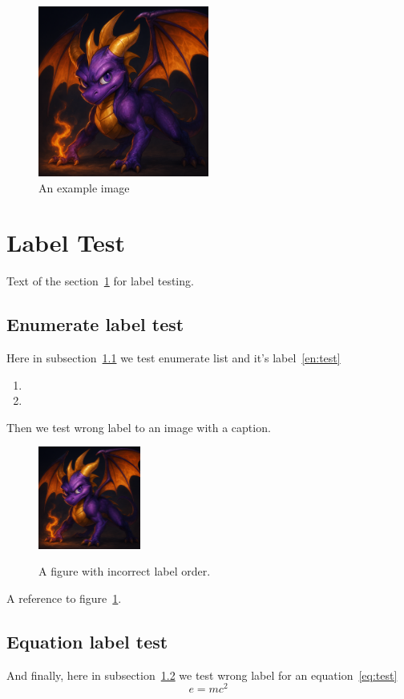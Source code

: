 \documentclass{article}
\begin{document}

\lipsum[1-3]
\begin{figure}[!htbp]
\centering
\includegraphics[width=0.5\textwidth]{example-image-c.png}
\caption{An example image}
\end{figure}
\lipsum[4-5]


\section{Label Test}
\label{sec:labtest}

Text of the section~\ref{sec:labtest} for label testing.

\subsection{Enumerate label test}
\label{subsec:enlabtest}

Here in subsection~\ref{subsec:enlabtest} we test enumerate list and it's label~\ref{en:test}
\begin{enumerate}
\label{en:test}
\item \lipsum[1]
\item \lipsum[2]
\end{enumerate}

Then we test wrong label to an image with a caption.
\begin{figure}[H]
    \centering
    \includegraphics[width=0.3\textwidth]{example-image-c.png}
    \label{fig:wrong_label_order} %
    \caption{A figure with incorrect label order.}
\end{figure}
A reference to figure~\ref{fig:wrong_label_order}. %

\subsection{Equation label test}
\label{subsec:eqlabtest}

And finally, here in subsection~\ref{subsec:eqlabtest} we test wrong label for an equation~\ref{eq:test}
\begin{equation}
e = mc^2
\end{equation}
\label{eq:test} 
\end{document}
